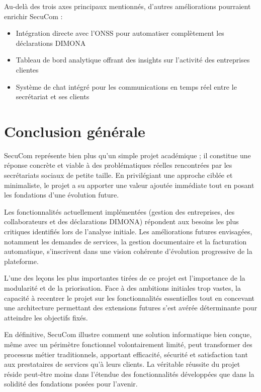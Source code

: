 Au-delà des trois axes principaux mentionnés, d'autres améliorations pourraient enrichir SecuCom :

\begin{itemize}
  \item Intégration directe avec l'ONSS pour automatiser complètement les déclarations DIMONA
  \item Tableau de bord analytique offrant des insights sur l'activité des entreprises clientes
  \item Système de chat intégré pour les communications en temps réel entre le secrétariat et ses clients
\end{itemize}

\section*{Conclusion générale}

SecuCom représente bien plus qu'un simple projet académique ; il constitue une réponse concrète et viable à des problématiques réelles rencontrées par les secrétariats sociaux de petite taille. En privilégiant une approche ciblée et minimaliste, le projet a su apporter une valeur ajoutée immédiate tout en posant les fondations d'une évolution future.

Les fonctionnalités actuellement implémentées (gestion des entreprises, des collaborateurs et des déclarations DIMONA) répondent aux besoins les plus critiques identifiés lors de l'analyse initiale. Les améliorations futures envisagées, notamment les demandes de services, la gestion documentaire et la facturation automatique, s'inscrivent dans une vision cohérente d'évolution progressive de la plateforme.

L'une des leçons les plus importantes tirées de ce projet est l'importance de la modularité et de la priorisation. Face à des ambitions initiales trop vastes, la capacité à recentrer le projet sur les fonctionnalités essentielles tout en concevant une architecture permettant des extensions futures s'est avérée déterminante pour atteindre les objectifs fixés.

En définitive, SecuCom illustre comment une solution informatique bien conçue, même avec un périmètre fonctionnel volontairement limité, peut transformer des processus métier traditionnels, apportant efficacité, sécurité et satisfaction tant aux prestataires de services qu'à leurs clients. La véritable réussite du projet réside peut-être moins dans l'étendue des fonctionnalités développées que dans la solidité des fondations posées pour l'avenir.
